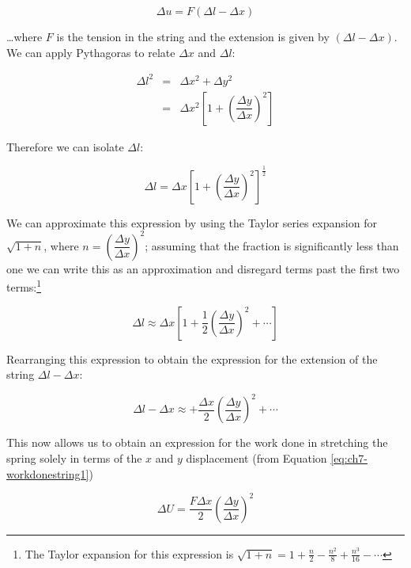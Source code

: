 \documentclass[
]{book}
\begin{document}
\begin{equation}
\Delta u = F(\Delta l - \Delta x)
\label{eq:ch7-workdonestring1}
\end{equation}

\ldots where \(F\) is the tension in the string and the extension is given by \((\Delta l - \Delta x)\). We can apply Pythagoras to relate \(\Delta x\) and \(\Delta l\):

\begin{equation}
\begin{array}{rcl}
\Delta l^2 &=& \Delta x^2 + \Delta y^2 \\
&=& \Delta x^2 \left[ 1 + \left( \dfrac{\Delta y}{\Delta x}\right)^2 \right]
\end{array}
\end{equation}

Therefore we can isolate \(\Delta l\):

\begin{equation}
\Delta l = \Delta x \left[ 1 + \left( \dfrac{\Delta y}{\Delta x}\right)^2 \right]^{\frac{1}{2}}
\end{equation}

We can approximate this expression by using the Taylor series expansion for \(\sqrt{1+n}\), where \(n = \left( \dfrac{\Delta y}{\Delta x}\right)^2\); assuming that the fraction is significantly less than one we can write this as an approximation and disregard terms past the first two terms:\footnote{The Taylor expansion for this expression is \(\sqrt{1+n} = 1+ \frac{n}{2} - \frac{n^2}{8} + \frac{n^3}{16} - \cdots\)}

\begin{equation}
\Delta l \approx \Delta x \left[ 1 + \frac{1}{2}\left( \dfrac{\Delta y}{\Delta x}\right)^2 + \cdots \right]
\end{equation}

Rearranging this expression to obtain the expression for the extension of the string \(\Delta l - \Delta x\):

\begin{equation}
\Delta l - \Delta x \approx   + \frac{\Delta x}{2} \left( \dfrac{\Delta y}{\Delta x}\right)^2 + \cdots
\end{equation}

This now allows us to obtain an expression for the work done in stretching the spring solely in terms of the \(x\) and \(y\) displacement (from Equation \eqref{eq:ch7-workdonestring1})

\begin{equation}
\Delta U = \frac{F\Delta x}{2} \left( \dfrac{\Delta y}{\Delta x}\right)^2
\end{equation}
\end{document}
